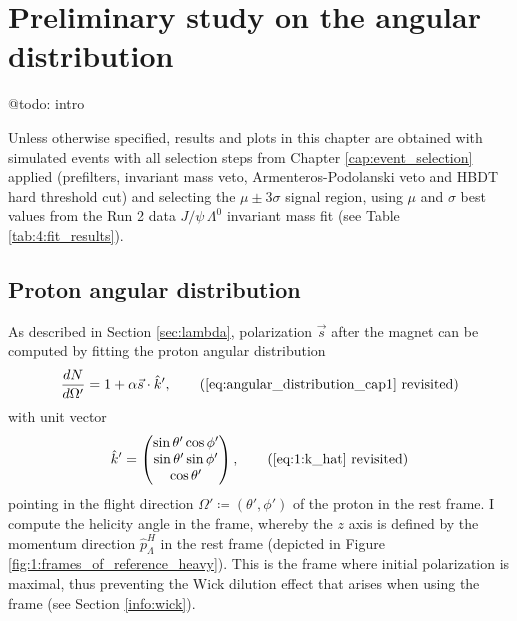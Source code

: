 \chapter{Preliminary study on the \texorpdfstring{\lambdadecay}{Lambda baryon decay} angular distribution}
\label{cap:angular_distribution}

@todo: intro

Unless otherwise specified, results and plots in this chapter are obtained with simulated \demonstratorshort events with all selection steps from Chapter \ref{cap:event_selection} applied (prefilters, \bz invariant mass veto, \kshort Armenteros-Podolanski veto and HBDT hard threshold cut) and selecting the $\mu \pm 3\sigma$ signal region, using $\mu$ and $\sigma$ best values from the Run 2 data $J/\psi\,\Lambda^0$ invariant mass fit (see Table \ref{tab:4:fit_results}).

\section{Proton angular distribution}
As described in Section \ref{sec:lambda}, \lz polarization $\vec{s}$ after the magnet can be computed by fitting the proton angular distribution
\begin{equation*}
	\frac{dN}{d\Omega'} = 1+ \alpha \vec{s} \cdot \hat{k}',
	\tag{\ref{eq:angular_distribution_cap1} revisited}
\end{equation*}
with unit vector
\begin{equation*}
\hat{k}'
=
\begin{pmatrix}
	\sin \theta' \cos \phi' \\
	\sin \theta' \sin \phi' \\
	\cos \theta'
\end{pmatrix},
\tag{\ref{eq:1:k_hat} revisited}
\end{equation*}
pointing in the flight direction $\Omega' \coloneqq (\theta',\phi')$ of the proton in the \lz rest frame.
I compute the helicity angle in the \slambda frame, whereby the $z$ axis is defined by the \lz momentum direction $\hat{p}_\Lambda^H$ in the \lbz rest frame \shad (depicted in Figure \ref{fig:1:frames_of_reference_heavy}).
This is the frame where initial \lz polarization is maximal, thus preventing the Wick dilution effect that arises when using the \slambdal frame (see Section \ref{info:wick}).

